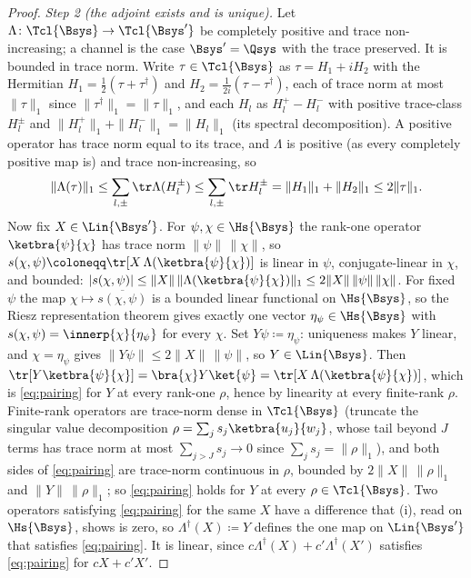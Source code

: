 \begin{proof}
\emph{Step 2 (the adjoint exists and is unique).} Let
$\Lambda\colon\Tcl{\Bsys}\to\Tcl{\Bsys'}$ be completely positive and trace
non-increasing; a channel is the case $\Bsys'=\Qsys$ with the trace preserved.
It is bounded in trace norm. Write $\tau\in\Tcl{\Bsys}$ as $\tau=H_1+iH_2$ with
the Hermitian $H_1=\tfrac12(\tau+\tau^{\dagger})$ and
$H_2=\tfrac1{2i}(\tau-\tau^{\dagger})$, each of trace norm at most
$\|\tau\|_1$ since $\|\tau^{\dagger}\|_1=\|\tau\|_1$, and each $H_l$ as
$H_l^+-H_l^-$ with positive trace-class $H_l^{\pm}$ and
$\|H_l^+\|_1+\|H_l^-\|_1=\|H_l\|_1$ (its spectral decomposition). A positive
operator has trace norm equal to its trace, and $\Lambda$ is positive (as every
completely positive map is) and trace non-increasing, so
\begin{equation*}
  \|\Lambda(\tau)\|_1\le\sum_{l,\pm}\tr\Lambda(H_l^{\pm})
  \le\sum_{l,\pm}\tr H_l^{\pm}=\|H_1\|_1+\|H_2\|_1\le2\|\tau\|_1 .
\end{equation*}
Now fix $X\in\Lin{\Bsys'}$. For $\psi,\chi\in\Hs{\Bsys}$ the rank-one operator
$\ketbra{\psi}{\chi}$ has trace norm $\|\psi\|\,\|\chi\|$, so
$s(\chi,\psi)\coloneqq\tr[X\,\Lambda(\ketbra{\psi}{\chi})]$ is linear in
$\psi$, conjugate-linear in $\chi$, and bounded:
$|s(\chi,\psi)|\le\|X\|\,\|\Lambda(\ketbra{\psi}{\chi})\|_1
\le2\|X\|\,\|\psi\|\,\|\chi\|$. For fixed $\psi$ the map
$\chi\mapsto\overline{s(\chi,\psi)}$ is a bounded linear functional on
$\Hs{\Bsys}$, so the Riesz representation theorem gives exactly one vector
$\eta_\psi\in\Hs{\Bsys}$ with $s(\chi,\psi)=\innerp{\chi}{\eta_\psi}$ for
every $\chi$. Set $Y\psi\coloneqq\eta_\psi$: uniqueness makes $Y$ linear, and
$\chi=\eta_\psi$ gives $\|Y\psi\|\le2\|X\|\,\|\psi\|$, so $Y\in\Lin{\Bsys}$.
Then $\tr[Y\ketbra{\psi}{\chi}]=\bra{\chi}Y\ket{\psi}
=\tr[X\,\Lambda(\ketbra{\psi}{\chi})]$, which is \eqref{eq:pairing} for $Y$ at
every rank-one $\rho$, hence by linearity at every finite-rank $\rho$.
Finite-rank operators are trace-norm dense in $\Tcl{\Bsys}$ (truncate the
singular value decomposition $\rho=\sum_js_j\ketbra{u_j}{w_j}$, whose tail
beyond $J$ terms has trace norm at most $\sum_{j>J}s_j\to0$ since
$\sum_js_j=\|\rho\|_1$), and both sides of \eqref{eq:pairing} are trace-norm
continuous in $\rho$, bounded by $2\|X\|\,\|\rho\|_1$ and
$\|Y\|\,\|\rho\|_1$; so \eqref{eq:pairing} holds for $Y$ at every
$\rho\in\Tcl{\Bsys}$. Two operators satisfying \eqref{eq:pairing} for the same
$X$ have a difference that (i), read on $\Hs{\Bsys}$, shows is zero, so
$\Lambda^{\dagger}(X)\coloneqq Y$ defines the one map on $\Lin{\Bsys'}$ that
satisfies \eqref{eq:pairing}. It is linear, since
$c\Lambda^{\dagger}(X)+c'\Lambda^{\dagger}(X')$ satisfies \eqref{eq:pairing}
for $cX+c'X'$.


\end{proof}
